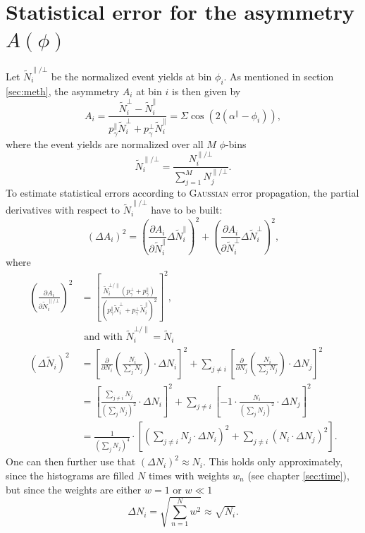 \section{Statistical error for the asymmetry $A(\phi)$}
\allowdisplaybreaks
\label{sec:stat_err}
Let $\tilde{N}^{\parallel/\bot}_i$ be the normalized event yields at bin $\phi_i$. As mentioned in section \ref{sec:meth}, the asymmetry $A_i$ at bin $i$ is then given by
\begin{equation}
	A_i=\frac{\tilde{N}^\bot_i-\tilde{N}^\parallel_i}{p_\gamma^\parallel\tilde{N}^\bot_i+p_\gamma^\bot\tilde{N}^\parallel_i}=\Sigma\cos\left(2\left(\alpha^\parallel-\phi_i\right)\right),
	\label{eq:evyieldasym_app}
\end{equation}
where the event yields are normalized over all $M$ $\phi$-bins $$\tilde{N}^{\parallel/\bot}_i=\frac{N_i^{\parallel/\bot}}{\sum_{j=1}^{M}N_j^{\parallel/\bot}}.$$
 To estimate statistical errors according to \textsc{Gaussian} error propagation, the partial derivatives with respect to $\tilde{N}_i^{\parallel/\bot}$ have to be built:
 \begin{equation}
 	\left(\Delta A_i\right)^2=\left(\frac{\partial A_i}{\partial \tilde{N}^\parallel_i}\Delta \tilde{N}^\parallel_i\right)^2+\left(\frac{\partial A_i}{\partial \tilde{N}^\bot_i}\Delta \tilde{N}^\bot_i\right)^2,
 \end{equation}
where
\begin{align}
	\left(\frac{\partial A_i}{\partial \tilde{N}^{\parallel/\bot}_i}\right)^2&=\left[\frac{\tilde{N}^{\bot/\parallel}_i\left(p_\gamma^\bot+p_\gamma^\parallel\right)}{\left(p_\gamma^\parallel\tilde{N}^{\bot}_i+p_\gamma^\bot\tilde{N}^\parallel_i\right)^2}\right]^2,\\
	&\text{ and with } \tilde{N}_i^{\bot/\parallel}=\tilde{N}_i\\
	\left(\Delta\tilde{N}_i\right)^2&=\left[\frac{\partial}{\partial N_i}\left(\frac{N_i}{\sum_{j}N_j}\right)\cdot\Delta N_i\right]^2+\sum_{j\neq i}\left[\frac{\partial}{\partial N_j}\left(\frac{N_i}{\sum_{j}N_j}\right)\cdot\Delta N_j\right]^2\\
	&=\left[\frac{\sum_{j\neq i} N_j}{\left(\sum_{j} N_j\right)^2}\cdot\Delta N_i\right]^2+\sum_{j\neq i}\left[-1\cdot\frac{N_i}{\left(\sum_{j}N_j\right)^2}\cdot\Delta N_j\right]^2\\
	&=\frac{1}{\left(\sum_{j} N_j\right)^4}\cdot\left[\left(\sum_{j\neq i} N_j \cdot\Delta N_i\right)^2+\sum_{j\neq i}\left(N_i\cdot\Delta N_j\right)^2\right].
\end{align}
One can then further use that $\left(\Delta N_i\right)^2  \approx N_i$. This holds only approximately, since the histograms are filled $N$ times with weights $w_n$ (see chapter \ref{sec:time}), but since the weights are either $w=1$ or $w\ll1$
\begin{equation}
	\Delta N_i=\sqrt{\sum_{n=1}^N w^2}\approx\sqrt{N_i}.
\end{equation}
\newpage
